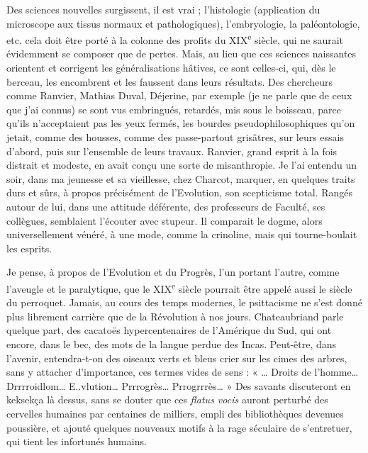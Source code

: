 \documentclass[french,twoside]{book} %
\begin{document}
Des sciences nouvelles surgissent, il est vrai ; l’histologie (application du microscope aux tissus normaux et pathologiques), l’embryologie, la paléontologie, etc. cela doit être porté à la colonne des profits du XIX\textsuperscript{e} siècle, qui ne saurait évidemment se composer que de pertes. Mais, au lieu que ces sciences naissantes orientent et corrigent les généralisations hâtives, ce sont celles-ci, qui, dès le berceau, les encombrent et les faussent dans leurs résultats. Des chercheurs comme Ranvier, Mathias Duval, Déjerine, par exemple (je ne parle que de ceux que j’ai connus) se sont vus embringués, retardés, mis sous le boisseau, parce qu’ils n’acceptaient pas les yeux fermés, les bourdes pseudophilosophiques qu’on jetait, comme des housses, comme des passe-partout grisâtres, sur leurs essais d’abord, puis sur l’ensemble de leurs travaux. Ranvier, grand esprit à la fois distrait et modeste, en avait conçu une sorte de misanthropie. Je l’ai entendu un soir, dans ma jeunesse et sa vieillesse, chez Charcot, marquer, en quelques traits durs et sûrs, à propos précisément de l’Evolution, son scepticisme total. Rangés autour de lui, dans une attitude déférente, des professeurs de Faculté, ses collègues, semblaient l’écouter avec stupeur. Il comparait le dogme, alors universellement vénéré, à une mode, comme la crinoline, mais qui tourne-boulait les esprits.\par
Je pense, à propos de l’Evolution et du Progrès, l’un portant l’autre, comme l’aveugle et le paralytique, que le XIX\textsuperscript{e} siècle pourrait être appelé aussi le siècle du perroquet. Jamais, au cours des temps modernes, le psittacisme ne s’est donné plus librement carrière que de la Révolution à nos jours. Chateaubriand parle quelque part, des cacatoës hypercentenaires de l’Amérique du Sud, qui ont encore, dans le bec, des mots de la langue perdue des Incas. Peut-être, dans l’avenir, entendra-t-on des oiseaux verts et bleus crier sur les cimes des arbres, sans y attacher d’importance, ces termes vides de sens : « … Droits de l’homme… Drrrroidlom… E..vlution… Prrrogrès… Prrogrrrès… » Des savants discuteront en keksekça là dessus, sans se douter que ces {\itshape flatus vocis} auront perturbé des cervelles humaines par centaines de milliers, empli des bibliothèques devenues poussière, et ajouté quelques nouveaux motifs à la rage séculaire de s’entretuer, qui tient les infortunés humains.\par
\end{document}
